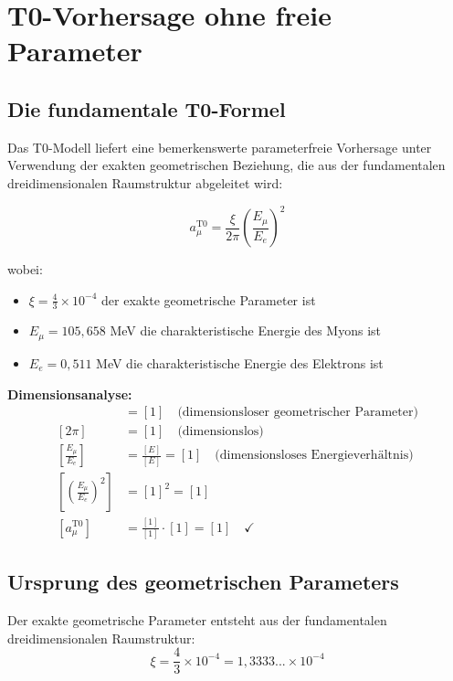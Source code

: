 \documentclass[12pt,a4paper]{report}
\begin{document}
	\section{T0-Vorhersage ohne freie Parameter}
	\label{sec:t0_prediction}
	
	\subsection{Die fundamentale T0-Formel}
	\label{subsec:t0_formula}
	
	Das T0-Modell liefert eine bemerkenswerte parameterfreie Vorhersage unter Verwendung der exakten geometrischen Beziehung, die aus der fundamentalen dreidimensionalen Raumstruktur abgeleitet wird:
	
	\begin{equation}
		\boxed{a_\mu^{\text{T0}} = \frac{\xi}{2\pi} \left(\frac{E_\mu}{E_e}\right)^2}
		\label{eq:t0_muon_formula}
	\end{equation}
	
	wobei:
	\begin{itemize}
		\item $\xi = \frac{4}{3} \times 10^{-4}$ der exakte geometrische Parameter ist
		\item $E_\mu = 105,658$ MeV die charakteristische Energie des Myons ist
		\item $E_e = 0,511$ MeV die charakteristische Energie des Elektrons ist
	\end{itemize}
	
	\textbf{Dimensionsanalyse:}
	\begin{align}
		[\xi] &= [1] \quad \text{(dimensionsloser geometrischer Parameter)} \\
		[2\pi] &= [1] \quad \text{(dimensionslos)} \\
		\left[\frac{E_\mu}{E_e}\right] &= \frac{[E]}{[E]} = [1] \quad \text{(dimensionsloses Energieverhältnis)} \\
		\left[\left(\frac{E_\mu}{E_e}\right)^2\right] &= [1]^2 = [1] \\
		[a_\mu^{\text{T0}}] &= \frac{[1]}{[1]} \cdot [1] = [1] \quad \checkmark
	\end{align}
	
	\subsection{Ursprung des geometrischen Parameters}
	\label{subsec:geometric_parameter_origin}
	
	Der exakte geometrische Parameter entsteht aus der fundamentalen dreidimensionalen Raumstruktur:
	\begin{equation}
		\xi = \frac{4}{3} \times 10^{-4} = 1,3333... \times 10^{-4}
	\end{equation}
	
\end{document}
